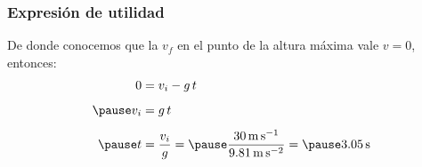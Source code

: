 \documentclass[14pt]{beamer}
\begin{document}
\begin{frame}
\frametitle{Expresión de utilidad}
De donde conocemos que la $v_{f}$ en el punto de la altura máxima vale $v = 0$, entonces:
\pause
\begin{eqnarray*}
\begin{aligned}
0 &= v_{i} - g \, t \\[0.5em] \pause
v_{i} &=  g \, t \\[0.5em] \pause
t &= \dfrac{v_{i}}{g} = \pause \dfrac{\SI{30}{\meter\per\second}}{\SI{9.81}{\meter\per\square\second}} = \pause \SI{3.05}{\second}
\end{aligned}
\end{eqnarray*}

\end{frame}
\end{document}
